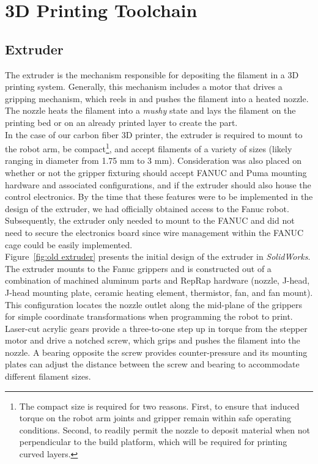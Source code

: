 \section{3D Printing Toolchain}

\subsection{Extruder}

\indent

The extruder is the mechanism responsible for depositing the filament in a 3D printing system. Generally, this mechanism includes a motor that drives a gripping mechanism, which reels in and pushes the filament into a heated nozzle. The nozzle heats the filament into a \emph{mushy} state and lays the filament on the printing bed or on an already printed layer to create the part.\\

In the case of our carbon fiber 3D printer, the extruder is required to mount to the robot arm, be compact\footnote{The compact size is required for two reasons. First, to ensure that induced torque on the robot arm joints and gripper remain within safe operating conditions. Second, to readily permit the nozzle to deposit material when not perpendicular to the build platform, which will be required for printing curved layers.}, and accept filaments of a variety of sizes (likely ranging in diameter from 1.75 mm to 3 mm). Consideration was also placed on whether or not the gripper fixturing should accept FANUC and Puma mounting hardware and associated configurations, and if the extruder should also house the control electronics. By the time that these features were to be implemented in the design of the extruder, we had officially obtained access to the Fanuc robot. Subsequently, the extruder only needed to mount to the FANUC and did not need to secure the electronics board since wire management within the FANUC cage could be easily implemented.\\

Figure~\ref{fig:old extruder} presents the initial design of the extruder in \emph{SolidWorks}. The extruder mounts to the Fanuc grippers and is constructed out of a combination of machined aluminum parts and RepRap hardware (nozzle, J-head, J-head mounting plate, ceramic heating element, thermistor, fan, and fan mount). This configuration locates the nozzle outlet along the mid-plane of the grippers for simple coordinate transformations when programming the robot to print. Laser-cut acrylic gears provide a three-to-one step up in torque from the stepper motor and drive a notched screw, which grips and pushes the filament into the nozzle. A bearing opposite the screw provides counter-pressure and its mounting plates can adjust the distance between the screw and bearing to accommodate different filament sizes.\\

